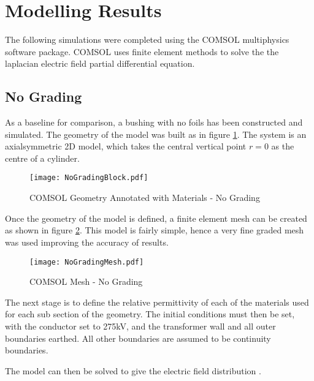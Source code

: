 \section{Modelling Results}
The following simulations were completed using the COMSOL multiphysics software package.
COMSOL uses finite element methods to solve the the laplacian electric field partial differential equation.

\subsection{No Grading}
As a baseline for comparison, a bushing with no foils has been constructed and simulated.
The geometry of the model was built as in figure \ref{figure:Geom:Nograde}.
The system is an axialsymmetric 2D model, which takes the central vertical point $r=0$ as the centre of a cylinder.
\begin{figure}[!h]
   \centering
   \texttt{[image: NoGradingBlock.pdf]}
   \caption{COMSOL Geometry Annotated with Materials - No Grading}
   \label{figure:Geom:Nograde}
\end{figure}

Once the geometry of the model is defined, a finite element mesh can be created as shown in figure \ref{figure:Mesh:Nograde}.
This model is fairly simple, hence a very fine graded mesh was used improving the accuracy of results.
\begin{figure}[!h]
   \centering
   \texttt{[image: NoGradingMesh.pdf]}
   \caption{COMSOL Mesh - No Grading}
   \label{figure:Mesh:Nograde}
\end{figure}

The next stage is to define the relative permittivity of each of the materials used for each sub section of the geometry.
The initial conditions must then be set, with the conductor set to 275kV, and the transformer wall and all outer boundaries earthed.
All other boundaries are assumed to be continuity boundaries.

The model can then be solved to give the electric field distribution
.
%
%
%
%
%
